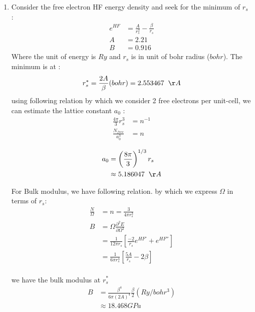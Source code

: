 \documentclass[notitlepage]{revtex4-1}
\begin{document}
\begin{CJK}{UTF8}{bsmi}
\begin{enumerate}
\begin{itemize}
\begin{enumerate}[label=(\arabic*)]
				\item  Consider the free electron HF energy density and seek for the minimum of $r_s$ :
				\begin{align*}
				e^{HF} &= \frac{A}{r_s^2} - \frac{\beta}{r_s} \\
				A &= 2.21 \\
				B &= 0.916
				\end{align*}
				Where the unit of energy is $Ry$ and $r_s$ is in unit of bohr radius ($bohr$). The minimum is at :
				\begin{equation*}
				r_s^{*} =\frac{2A}{\beta} (bohr)=  2.553467 \hspace{0.2cm} \AA 
				\end{equation*} 
				using following relation by which we consider 2 free electrons per unit-cell, we can estimate the lattice constant $a_0$ :
				\begin{align*}
				\frac{4\pi}{3}r_s^3 &= n^{-1} \\
				\frac{N_{free}}{a_0^3} &= n 
				\end{align*}
				
				\begin{align*}
				a_0 &= \left( \frac{8\pi}{3}\right)^{1/3} r_s \\
				&\approx 5.186047 \hspace{0.2cm} \AA \\
				\end{align*}
				
				For Bulk modulus, we have following relation. by which we express $\Omega$ in terms of $r_s$:
				\begin{align*}
				\frac{N}{\Omega} &= n = \frac{3}{4\pi r_s^3} \\
				B &= \Omega \frac{\partial^{2}E}{\partial \Omega^{2}} \\
				&= \frac{1}{12\pi r_s}\left[ \frac{-2}{r_s}e^{HF'} + e^{HF''} \right] \\
				&= \frac{1}{6\pi r_s^4} \left[ \frac{5A}{r_s} - 2\beta \right] \\
				\end{align*}
				
				we have the bulk modulus at $r_s^{*}$
				\begin{align*}
				B &= \frac{\beta^4}{6\pi(2A)^4} \frac{\beta}{2} (Ry/bohr^3)\\
				&\approx 18.468 GPa
				\end{align*}
				

\end{enumerate}
\end{itemize}
\end{enumerate}
\end{CJK}
\end{document}
